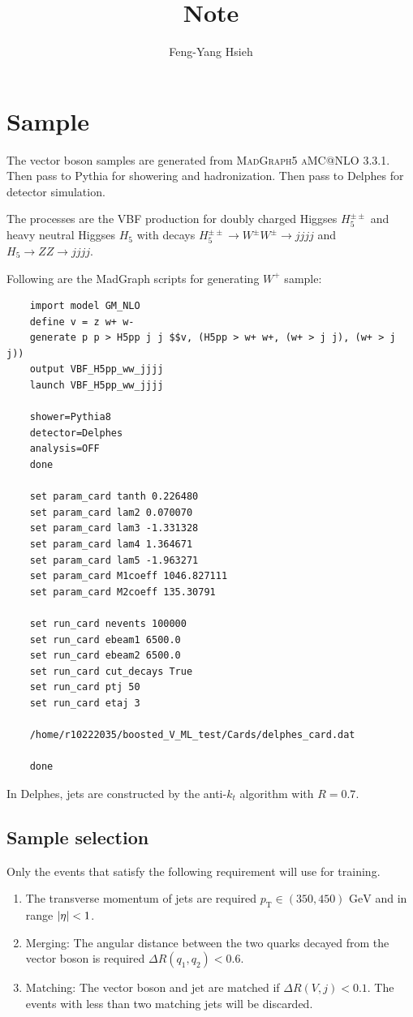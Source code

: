 \documentclass[12pt]{article}
\title{Note}
\author{Feng-Yang Hsieh}
\date{}
\begin{document}
\maketitle

\section{Sample}%
\label{sec:sample}
	The vector boson samples are generated from \textsc{MadGraph5 aMC@NLO 3.3.1}. Then pass to Pythia for showering and hadronization. Then pass to Delphes for detector simulation. 	

	The processes are the VBF production for doubly charged Higgses $H_5^{\pm\pm}$ and heavy neutral Higgses $H_5$ with decays $H_5^{\pm\pm} \to W^{\pm}W^{\pm} \to jjjj$ and $H_5\to ZZ \to jjjj$.

	Following are the MadGraph scripts for generating $W^{+}$ sample:
	\begin{verbatim}
	import model GM_NLO
	define v = z w+ w-
	generate p p > H5pp j j $$v, (H5pp > w+ w+, (w+ > j j), (w+ > j j))
	output VBF_H5pp_ww_jjjj
	launch VBF_H5pp_ww_jjjj

	shower=Pythia8
	detector=Delphes
	analysis=OFF
	done

	set param_card tanth 0.226480
	set param_card lam2 0.070070
	set param_card lam3 -1.331328
	set param_card lam4 1.364671
	set param_card lam5 -1.963271
	set param_card M1coeff 1046.827111
	set param_card M2coeff 135.30791

	set run_card nevents 100000
	set run_card ebeam1 6500.0
	set run_card ebeam2 6500.0
	set run_card cut_decays True
	set run_card ptj 50
	set run_card etaj 3

	/home/r10222035/boosted_V_ML_test/Cards/delphes_card.dat

	done	
	\end{verbatim}

	In Delphes, jets are constructed by the anti-$k_t$ algorithm with $R = 0.7$.

	\subsection{Sample selection}%
	\label{sub:sample_selection}
		Only the events that satisfy the following requirement will use for training.
		\begin{enumerate}
			\item The transverse momentum of jets are required $p_\text{T} \in (350, 450) \text{ GeV}$ and in range $\abs{\eta}<1$.
			\item Merging: The angular distance between the two quarks decayed from the vector boson is required $\Delta R(q_1,q_2) < 0.6$.
			\item Matching: The vector boson and jet are matched if $\Delta R(V,j) < 0.1$. The events with less than two matching jets will be discarded.
		\end{enumerate}
	
\end{document}
